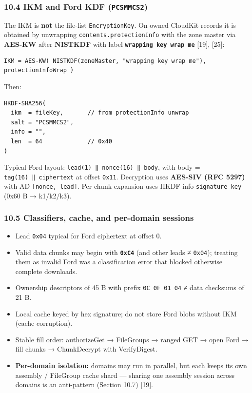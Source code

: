 \documentclass[
  english,
  10pt]{article}
\providecommand{\tightlist}{%
  \setlength{\itemsep}{0pt}\setlength{\parskip}{0pt}}
\begin{document}
\subsubsection{\texorpdfstring{10.4 IKM and Ford KDF
(\texttt{PCSMMCS2})}{10.4 IKM and Ford KDF (PCSMMCS2)}}\label{ikm-and-ford-kdf-pcsmmcs2}

The IKM is \textbf{not} the file-list \texttt{EncryptionKey}. On owned
CloudKit records it is obtained by unwrapping
\texttt{contents.protectionInfo} with the zone master via
\textbf{AES-KW} after \textbf{NISTKDF} with label
\textbf{\texttt{wrapping\ key\ wrap\ me}} {[}19{]}, {[}25{]}:

\begin{verbatim}
IKM = AES-KW( NISTKDF(zoneMaster, "wrapping key wrap me"), protectionInfoWrap )
\end{verbatim}

Then:

\begin{verbatim}
HKDF-SHA256(
  ikm  = fileKey,       // from protectionInfo unwrap
  salt = "PCSMMCS2",
  info = "",
  len  = 64             // 0x40
)
\end{verbatim}

Typical Ford layout: \texttt{lead(1)\ ‖\ nonce(16)\ ‖\ body}, with body
= \texttt{tag(16)\ ‖\ ciphertext} at offset \texttt{0x11}. Decryption
uses \textbf{AES-SIV (RFC 5297)} with AD \texttt{{[}nonce,\ lead{]}}.
Per-chunk expansion uses HKDF info \texttt{signature-key} (0x60 B →
k1/k2/k3).

\subsubsection{10.5 Classifiers, cache, and per-domain
sessions}\label{classifiers-cache-and-per-domain-sessions}

\begin{itemize}
\tightlist
\item
  Lead \texttt{0x04} typical for Ford ciphertext at offset 0.
\item
  Valid data chunks may begin with \textbf{\texttt{0xC4}} (and other
  leads ≠ \texttt{0x04}); treating them as invalid Ford was a
  classification error that blocked otherwise complete downloads.
\item
  Ownership descriptors of 45 B with prefix \texttt{0C\ 0F\ 01\ 04} ≠
  data checksums of 21 B.
\item
  Local cache keyed by hex signature; do not store Ford blobs without
  IKM (cache corruption).
\item
  Stable fill order: authorizeGet → FileGroups → ranged GET → open Ford
  → fill chunks → ChunkDecrypt with VerifyDigest.
\item
  \textbf{Per-domain isolation:} domains may run in parallel, but each
  keeps its own assembly / FileGroup cache shard --- sharing one
  assembly session across domains is an anti-pattern (Section 10.7)
  {[}19{]}.
\end{itemize}
\end{document}
